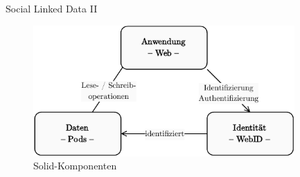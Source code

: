 \begin{frame}{Social Linked Data II \footnotesize\cite{mecklerWebLinkedData2023}}
    \vspace{1em}
    \begin{figure}
        \includegraphics[height=5cm]{./assets/solid_triangle.drawio.pdf}
        \caption{Solid-Komponenten}
    \end{figure}
\end{frame}


